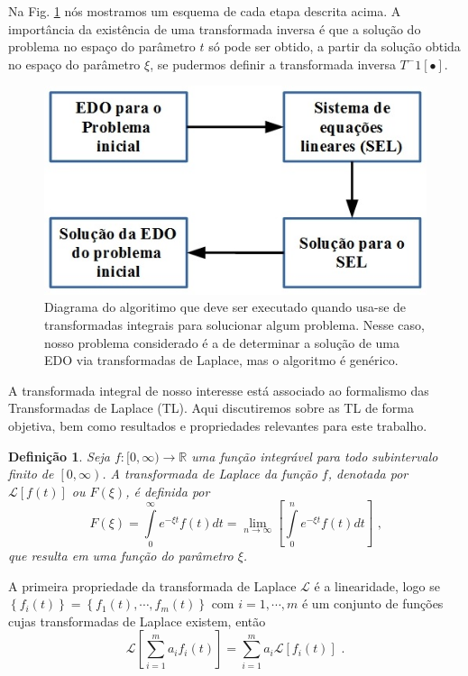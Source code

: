 \documentclass[twocolumn]{rbef}
\newcommand{\1}{\mathbbm{1}}
\newtheorem{defi}{Definição}
\begin{document}
Na Fig. \ref{EDO} n\'{o}s mostramos um esquema de cada etapa
descrita acima. A importância da existência de uma transformada
inversa é que a solução do problema no espaço do parâmetro $t$
só pode ser obtido, a partir da solução obtida no espaço do
parâmetro $\xi$, se pudermos definir a transformada inversa
$T^-1[\bullet]$.

\begin{figure}[!htb]
  \centering \includegraphics[scale=0.5]{EDO.jpg}
  \caption{Diagrama do algoritimo que deve ser executado quando usa-se
    de transformadas integrais para solucionar algum problema. Nesse
    caso, nosso problema considerado é a de determinar a solução de uma
    EDO via transformadas de Laplace, mas o algoritmo é genérico.}
  \label{EDO}
\end{figure}

A transformada integral de nosso interesse está associado ao formalismo
das Transformadas de Laplace (TL). Aqui discutiremos sobre as TL de
forma objetiva, bem como resultados e propriedades relevantes para este
trabalho.

\begin{defi}
  Seja $f:[0,\infty) \longrightarrow \mathbb{R}$ uma função integrável
  para todo subintervalo finito de $\left[ 0,\infty\right) $. A
  transformada de Laplace da função $f$, denotada por
  $\mathcal{L}[f(t)]$ ou $F(\xi)$, é definida por
  \begin{equation}
    F(\xi)=\int\limits_{0}^{\infty}e^{-\xi t}f(t)dt=\lim_{n \to \infty}\left[\int\limits_{0}^{n}e^{-\xi t}f(t)dt\right] \text{ ,}
  \end{equation}
  que resulta em uma função do parâmetro $\xi$.
\end{defi}

A primeira propriedade da transformada de Laplace $\mathcal{L}$ é a
linearidade, logo se
$\left\lbrace f_{i}(t)\right\rbrace = \left\lbrace
  f_{1}(t),\cdots,f_{m}(t)\right\rbrace $ com $i=1,\cdots,m$ é um
conjunto de funções cujas transformadas de Laplace existem, então
\begin{equation}
  \mathcal{L}\left[\sum_{i=1}^{m}a_{i}f_{i}(t)\right]= \sum_{i=1}^{m}a_{i}\mathcal{L}\left[f_{i}(t) \right] \text{ .} \label{linear}
\end{equation}
\end{document}
